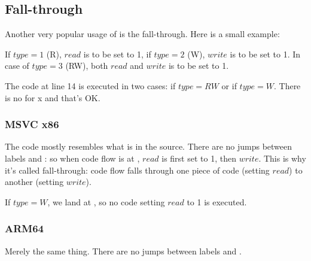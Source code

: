 ﻿\subsection{Fall-through}

Another very popular usage of  is the fall-through.
Here is a small example:



If $type=1$ (R), $read$ is to be set to 1, if $type=2$ (W), $write$ is to be set to 1.
In case of $type=3$ (RW), both $read$ and $write$ is to be set to 1.

The code at line 14 is executed in two cases: if $type=RW$ or if $type=W$.
There is no  for x and that's OK.

\subsubsection{MSVC x86}



The code mostly resembles what is in the source.
There are no jumps between labels  and : so when code flow is at 
, $read$ is first set to 1, then $write$.
This is why it's called fall-through: code flow falls through one piece of code
(setting $read$) to another (setting $write$).

If $type=W$, we land at , so no code setting $read$ to 1 is executed.

\subsubsection{ARM64}



Merely the same thing.
There are no jumps between labels  and .

